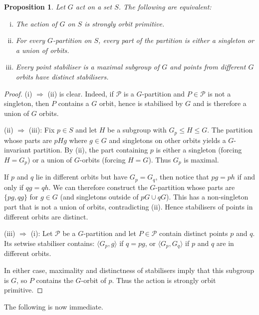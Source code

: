 \documentclass[11pt,a4paper]{amsart}
\newtheorem{proposition}[theorem]{Proposition}
\theoremstyle{definition}
\theoremstyle{remark}
\begin{document}
\begin{proposition}
		Let $G$ act on a set $S$. The following are equivalent: 
	\begin{enumerate}[(i)]
		\item The action of $G$ on $S$ is strongly orbit primitive. 
		\item For every $G$-partition on $S$, every part of the partition is either a singleton or a union of orbits.
		\item Every point stabiliser is a maximal subgroup of $G$ and points from different $G$ orbits have distinct stabilisers. 
	\end{enumerate}
\end{proposition}
\begin{proof}

	
	
	(i) $\Rightarrow$ (ii) is clear. Indeed, if $\mathcal{P}$ is a $G$-partition and $P \in \mathcal{P}$ is not a singleton, then $P$ contains a $G$ orbit, hence is stabilised by $G$ and is therefore a union of $G$ orbits. 
	
	(ii) $\Rightarrow$ (iii):  
	Fix $p\in S$ and let $H$ be a subgroup with $G_p \le H \le G$.  
	The partition whose parts are $pHg$ where $g \in G$ and singletons on other orbits 
	yields a $G$-invariant partition.  
	By (ii), the part containing $p$ is either a singleton (forcing $H=G_p$) 
	or a union of $G$-orbits (forcing $H=G$).  
	Thus $G_p$ is maximal.  
	
	If $p$ and $q$ lie in different orbits but have $G_p=G_q$, then notice that $pg=ph$ if and only if $qg=qh$. We can therefore construct the $G$-partition whose parts are $\{ pg, qg \}$ for $g \in G$  (and singletons outside of $pG \cup qG$). This 
	has a non-singleton part that is not a union of orbits, 
	contradicting (ii).  
	Hence stabilisers of points in different orbits are distinct.
	
	(iii) $\Rightarrow$ (i):  
	Let $\mathcal{P}$ be a $G$-partition and let $P \in \mathcal{P}$ 
	contain distinct points $p$ and $q$.  
	Its setwise stabiliser contains:
	 $\langle G_p, g \rangle$ if $q = pg$, or  
	$\langle G_p, G_q \rangle$ if $p$ and $q$ are in different orbits.
	
	In either case, maximality and distinctness of stabilisers imply that 
	this subgroup is $G$, so $P$ contains the $G$-orbit of $p$.  
	Thus the action is strongly orbit primitive.
	
\end{proof}

The following is now immediate. 
\end{document}
